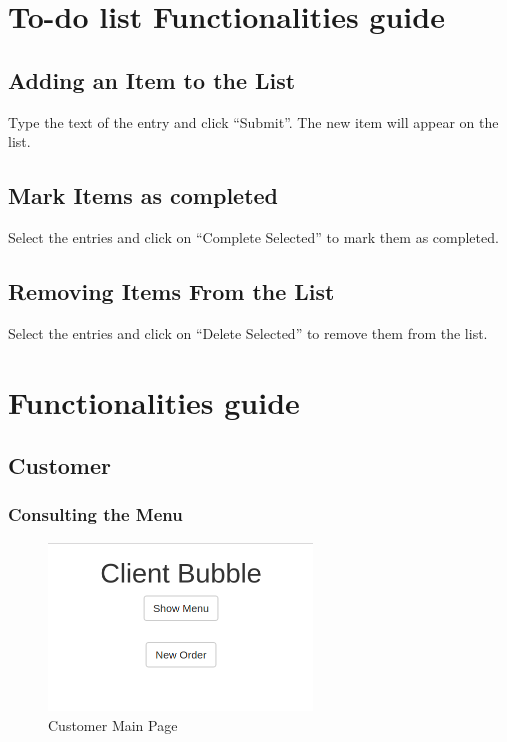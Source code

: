 \section{To-do list Functionalities guide}
\subsection{Adding an Item to the List}
Type the text of the entry and click ``Submit''. The new item will appear on the list.
\subsection{Mark Items as completed}
Select the entries and click on ``Complete Selected'' to mark them as completed. 
\subsection{Removing Items From the List}
Select the entries and click on ``Delete Selected'' to remove them from the list.

\section{\DemoName{} Functionalities guide}
\subsection{Customer}
\subsubsection{Consulting the Menu}
\begin{figure}[H]
	\centering
	\includegraphics[width=7cm]{../../documenti/UserManualDemo/demo_screens/client_main.png}
	\caption{Customer Main Page}
\end{figure}
